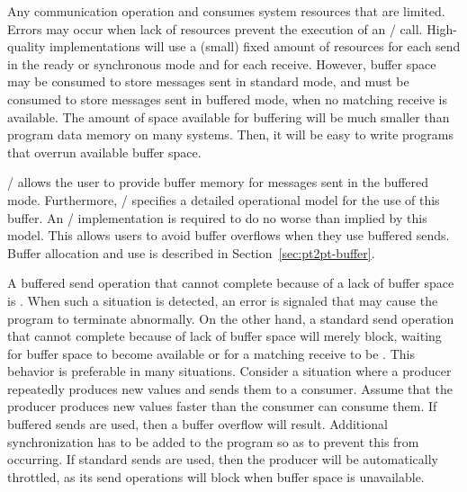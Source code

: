 Any  communication operation
and 
consumes system resources that are limited.
Errors may occur when lack of resources prevent the execution of an \MPI/ call.
High-quality implementations will use a (small) fixed amount of resources for
each  send in the ready or synchronous mode and for each
 receive. However, buffer
space may be consumed to store messages sent in standard mode, and must
be consumed to store
messages sent in buffered mode, when no matching receive is available.
The amount of space available for buffering will be much smaller than program
data memory on many systems.  Then, it will be easy to write programs that
overrun available buffer space.

\MPI/ allows the user to provide buffer memory for messages sent in the buffered
mode.  Furthermore, \MPI/ specifies a detailed operational
model for the use of this
buffer.  An \MPI/ implementation is required
to do no worse than implied by this model.  This allows users to avoid buffer
overflows when they use buffered sends.  Buffer allocation and use is
described
in Section~\ref{sec:pt2pt-buffer}.

A buffered send operation that cannot complete because of a lack of buffer space
is .  When such a situation is detected, an error is signaled that may
cause the program to terminate abnormally.
On the other hand, a standard send
operation that cannot complete because
of lack of buffer space will merely block, waiting for buffer space to become
available or for a matching receive to be .  This behavior is preferable
in many situations.  Consider a situation where a producer repeatedly produces
new values and sends them to a consumer.  Assume that the producer produces
new values faster than the consumer can consume them.  If buffered sends are
used, then a buffer overflow will result.  Additional synchronization has to
be added to the program so as to prevent this from occurring.
If standard sends are used, then the producer will be automatically throttled,
as its send operations will block when buffer space is unavailable.

